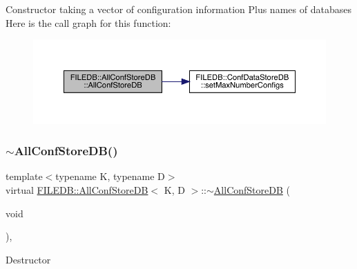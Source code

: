 Constructor taking a vector of configuration information Plus names of databases Here is the call graph for this function\+:
\nopagebreak
\begin{figure}[H]
\begin{center}
\leavevmode
\includegraphics[width=350pt]{df/db6/classFILEDB_1_1AllConfStoreDB_ab8b213578395f0ac7d436a82f4a26fe1_cgraph}
\end{center}
\end{figure}
\mbox{\label{classFILEDB_1_1AllConfStoreDB_ac5fe65eab60f20d7b8124c69c0bd5923}} 
\subsubsection{\texorpdfstring{$\sim$AllConfStoreDB()}{~AllConfStoreDB()}\hspace{0.1cm}{\footnotesize\ttfamily [2/3]}}
{\footnotesize\ttfamily template$<$typename K, typename D$>$ \\
virtual \mbox{\hyperlink{classFILEDB_1_1AllConfStoreDB}{F\+I\+L\+E\+D\+B\+::\+All\+Conf\+Store\+DB}}$<$ K, D $>$\+::$\sim$\mbox{\hyperlink{classFILEDB_1_1AllConfStoreDB}{All\+Conf\+Store\+DB}} (\begin{DoxyParamCaption}\item[{void}]{ }\end{DoxyParamCaption})\hspace{0.3cm}{\ttfamily [inline]}, {\ttfamily [virtual]}}

Destructor \mbox{\label{classFILEDB_1_1AllConfStoreDB_a72b72501b29029e2bfb682565f96eac0}} 
